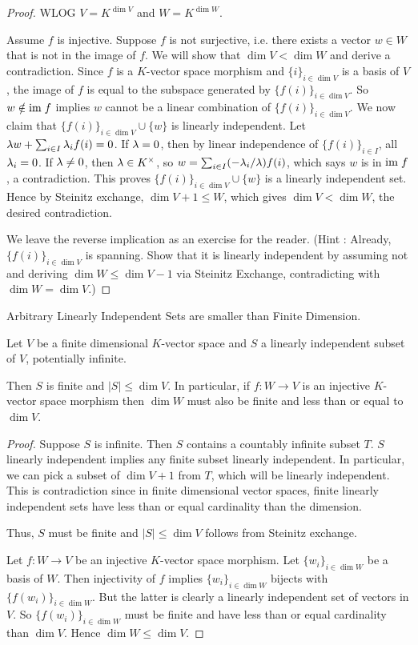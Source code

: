 \documentclass[../../book.tex]{subfiles}
\begin{document}
\begin{proof}
    WLOG $V = K^{\dim V}$ and $W = K^{\dim W}$. 

    Assume $f$ is injective. 
    Suppose $f$ is not surjective, i.e.
    there exists a vector $w \in W$ that is not in the image of $f$. 
    We will show that $\dim V < \dim W$ and derive a contradiction. 
    Since $f$ is a $K$-vector space morphism and 
    $\{i\}_{i\in\dim V}$ is a basis of $V$, 
    the image of $f$ is equal to the subspace generated by $\{f(i)\}_{i\in\dim V}$.
    So $w \notin \textnormal{im}\; f$ implies 
    $w$ cannot be a linear combination of $\{f(i)\}_{i\in\dim V}$.
    We now claim that $\{f(i)\}_{i\in\dim V} \cup \{w\}$ is linearly independent. 
    Let $\lambda w + \sum_{i\in I} \lambda_i f(i) = 0$. 
    If $\lambda = 0$, then by linear independence of $\{f(i)\}_{i\in I}$, all $\lambda_i = 0$. If $\lambda \neq 0$, then $\lambda \in K^\times$,
    so $w = \sum_{i\in I} (-\lambda_i/\lambda)f(i)$, 
    which says $w$ is in $\textnormal{im}\; f$, a contradiction. 
    This proves $\{f(i)\}_{i\in\dim V} \cup \{w\}$ is a linearly independent set.
    Hence by Steinitz exchange, $\dim V + 1 \leq W$,
    which gives $\dim V < \dim W$, the desired contradiction. 
    
    We leave the reverse implication as an exercise for the reader. 
    (Hint : Already, $\{f(i)\}_{i\in\dim V}$ is spanning. 
    Show that it is linearly independent by assuming not and 
    deriving $\dim W \leq \dim V - 1$ via Steinitz Exchange, 
    contradicting with $\dim W = \dim V$.)
\end{proof}
\begin{cor} Arbitrary Linearly Independent Sets are smaller than Finite Dimension.
    
    Let $V$ be a finite dimensional $K$-vector space and
    $S$ a linearly independent subset of $V$, potentially infinite.
    
    Then $S$ is finite and $|S| \leq \dim V$. 
    In particular, if $f : W \to V$ is an injective $K$-vector space morphism
    then $\dim W$ must also be finite and less than or equal to $\dim V$.
\end{cor}
\begin{proof}
    Suppose $S$ is infinite. Then $S$ contains a countably infinite subset $T$.
    $S$ linearly independent implies any finite subset linearly independent.
    In particular, we can pick a subset of $\dim V + 1$ from $T$,
    which will be linearly independent. 
    This is contradiction since in finite dimensional vector spaces,
    finite linearly independent sets 
    have less than or equal cardinality than the dimension.
    
    Thus, $S$ must be finite and $|S| \leq \dim V$ follows from Steinitz exchange.
    
    Let $f : W \to V$ be an injective $K$-vector space morphism. 
    Let $\{w_i\}_{i\in\dim W}$ be a basis of $W$. 
    Then injectivity of $f$ implies $\{w_i\}_{i\in\dim W}$ bijects with
    $\{f(w_i)\}_{i\in\dim W}$.
    But the latter is clearly a linearly independent set of vectors in $V$.
    So $\{f(w_i)\}_{i\in\dim W}$ must be finite and 
    have less than or equal cardinality than $\dim V$.
    Hence $\dim W \leq \dim V$. 
\end{proof}
\end{document}
